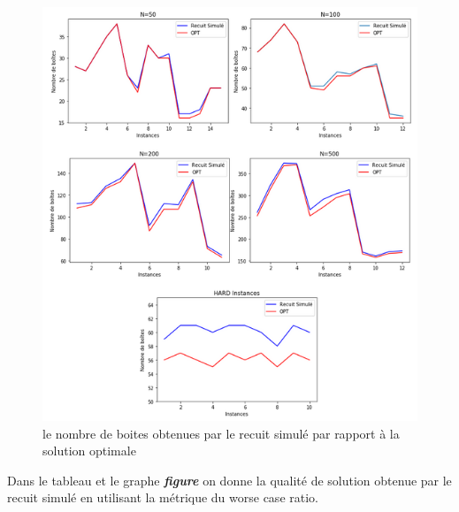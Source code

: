 \documentclass[12pt]{article}
\begin{document}
\begin{figure}[H]
    \centering
    \includegraphics[width=\linewidth, scale=1.3]{../figures/RS/rs figures.PNG}
    \caption{le nombre de boites obtenues par le recuit simulé par rapport à la solution optimale}
    \label{fig:n_bins}
\end{figure}
Dans le tableau et le graphe \textbf{\emph{figure }}on donne la qualité de solution obtenue par le recuit simulé en utilisant la métrique du worse case ratio.
\end{document}
